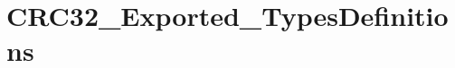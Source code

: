 \hypertarget{group___c_r_c32___exported___types_definitions}{}\section{C\+R\+C32\+\_\+\+Exported\+\_\+\+Types\+Definitions}
\label{group___c_r_c32___exported___types_definitions}
